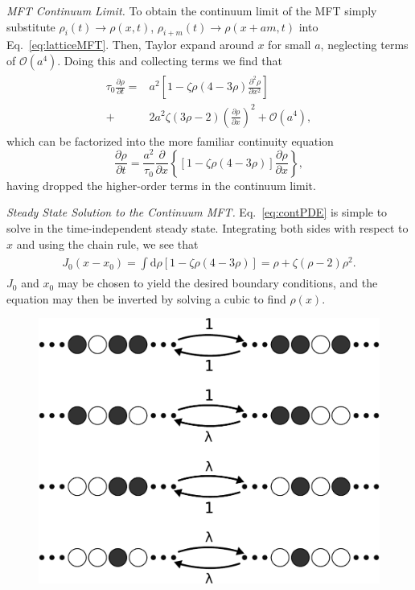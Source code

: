 \documentclass[
reprint,
 amsmath,amssymb,
 aps,
 prl,
]{revtex4-1}
\newcommand{\partDeriv}[2]{\frac{\partial #1}{\partial #2}}
\begin{document}
\textit{MFT Continuum Limit.} To obtain the continuum limit of the MFT simply substitute $\rho_i(t) \rightarrow \rho(x, t)$, $\rho_{i+m}(t) \rightarrow \rho(x + am, t)$ into Eq.~\ref{eq:latticeMFT}.
Then, Taylor expand around $x$ for small $a$, neglecting terms of $\mathcal{O}(a^4)$. Doing this and collecting terms we find that
\begin{align}
 \begin{split}
  \tau_0 \partDeriv{\rho}{t} =& a^2 \left[ 1-\zeta \rho (4-3\rho) \partDeriv{^2 \rho}{x^2}  \right] \\
  +& 2 a^2 \zeta (3\rho-2) \left(\partDeriv{\rho}{x}\right)^2 + \mathcal{O}(a^4) ,
 \end{split}
\end{align}
which can be factorized into the more familiar continuity equation
\begin{equation}
\label{eq:contPDE}
 \partDeriv{\rho}{t} = \frac{a^2}{\tau_0} \partDeriv{}{x} \left\{ \left[1 - \zeta \rho\left(4-3\rho\right) \right] \partDeriv{\rho}{x} \right\},
\end{equation}
having dropped the higher-order terms in the continuum limit.

\textit{Steady State Solution to the Continuum MFT.} Eq.~\ref{eq:contPDE} is simple to solve in the time-independent steady state. Integrating both sides with respect to $x$ and using the chain rule, we see that
\begin{align}
 \begin{split}
  J_0 (x-x_0) = \int \! \! \mathrm{d} \rho  \left[1 - \zeta \rho\left(4-3\rho\right) \right]  = \rho + \zeta (\rho - 2) \rho^2 .
 \end{split}
\end{align}
$J_0$ and $x_0$ may be chosen to yield the desired boundary conditions, and the equation may then be inverted by solving a cubic to find $\rho(x)$.

\begin{figure}[h!]
\vspace{0em}
\caption{\label{fig:detailedBalance}
\vspace{1em}}
\includegraphics[width=0.98\linewidth]{images/detailedBalanceDiagram-crop}
    \vspace{-0em}
\end{figure}
\end{document}
